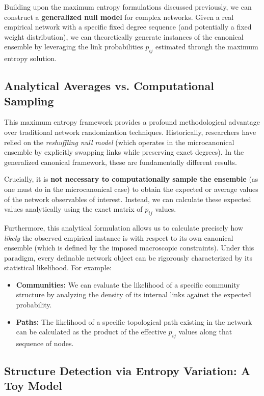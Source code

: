Building upon the maximum entropy formulations discussed previously, we can construct a \textbf{generalized null model} for complex networks. Given a real empirical network with a specific fixed degree sequence (and potentially a fixed weight distribution), we can theoretically generate instances of the canonical ensemble by leveraging the link probabilities \(p_{ij}\) estimated through the maximum entropy solution.

\subsection{Analytical Averages vs. Computational Sampling}
\label{subsec:analytical_averages}

This maximum entropy framework provides a profound methodological advantage over traditional network randomization techniques. Historically, researchers have relied on the \textit{reshuffling null model} (which operates in the microcanonical ensemble by explicitly swapping links while preserving exact degrees). In the generalized canonical framework, these are fundamentally different results.

Crucially, it is \textbf{not necessary to computationally sample the ensemble} (as one must do in the microcanonical case) to obtain the expected or average values of the network observables of interest. Instead, we can calculate these expected values analytically using the exact matrix of \(p_{ij}\) values.

Furthermore, this analytical formulation allows us to calculate precisely how \textit{likely} the observed empirical instance is with respect to its own canonical ensemble (which is defined by the imposed macroscopic constraints). Under this paradigm, every definable network object can be rigorously characterized by its statistical likelihood. For example:
\begin{itemize}
    \item \textbf{Communities:} We can evaluate the likelihood of a specific community structure by analyzing the density of its internal links against the expected probability.
    \item \textbf{Paths:} The likelihood of a specific topological path existing in the network can be calculated as the product of the effective \(p_{ij}\) values along that sequence of nodes.
\end{itemize}

\subsection{Structure Detection via Entropy Variation: A Toy Model}
\label{subsec:structure_detection_toy_model}

